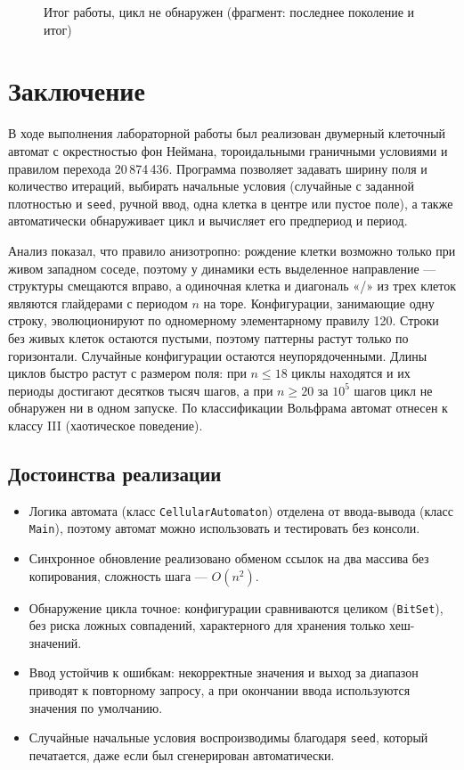 \documentclass[a4paper,14pt]{extarticle}
\newcommand{\consolemedium}{\fontsize{9}{10.5}\selectfont\ttfamily}
\newcommand{\consolesmall}{\fontsize{7}{7.35}\selectfont\ttfamily}
\newcommand{\console}[2][\consolesmall]{}
\begin{document}
\begin{figure}[H]
	\centering
	\console[\consolemedium]{nocycle}
	\caption{Итог работы, цикл не обнаружен (фрагмент: последнее поколение и итог)}
	\label{fig:nocycle}
\end{figure}

\newpage
\section*{Заключение}
{}

В ходе выполнения лабораторной работы был реализован двумерный клеточный автомат с окрестностью фон Неймана, тороидальными граничными условиями и правилом перехода 20\,874\,436. Программа позволяет задавать ширину поля и количество итераций, выбирать начальные условия (случайные с заданной плотностью и \texttt{seed}, ручной ввод, одна клетка в центре или пустое поле), а также автоматически обнаруживает цикл и вычисляет его предпериод и период.

Анализ показал, что правило анизотропно: рождение клетки возможно только при живом западном соседе, поэтому у динамики есть выделенное направление --- структуры смещаются вправо, а одиночная клетка и диагональ «/» из трех клеток являются глайдерами с периодом $n$ на торе. Конфигурации, занимающие одну строку, эволюционируют по одномерному элементарному правилу 120. Строки без живых клеток остаются пустыми, поэтому паттерны растут только по горизонтали. Случайные конфигурации остаются неупорядоченными. Длины циклов быстро растут с размером поля: при $n \le 18$ циклы находятся и их периоды достигают десятков тысяч шагов, а при $n \ge 20$ за $10^5$ шагов цикл не обнаружен ни в одном запуске. По классификации Вольфрама автомат отнесен к классу III (хаотическое поведение).

\subsection*{Достоинства реализации}

\begin{itemize}
	\item Логика автомата (класс \texttt{CellularAutomaton}) отделена от ввода-вывода (класс \texttt{Main}), поэтому автомат можно использовать и тестировать без консоли.
	\item Синхронное обновление реализовано обменом ссылок на два массива без копирования, сложность шага --- $O(n^2)$.
	\item Обнаружение цикла точное: конфигурации сравниваются целиком (\texttt{BitSet}), без риска ложных совпадений, характерного для хранения только хеш-значений.
	\item Ввод устойчив к ошибкам: некорректные значения и выход за диапазон приводят к повторному запросу, а при окончании ввода используются значения по умолчанию.
	\item Случайные начальные условия воспроизводимы благодаря \texttt{seed}, который печатается, даже если был сгенерирован автоматически.
\end{itemize}
\end{document}
